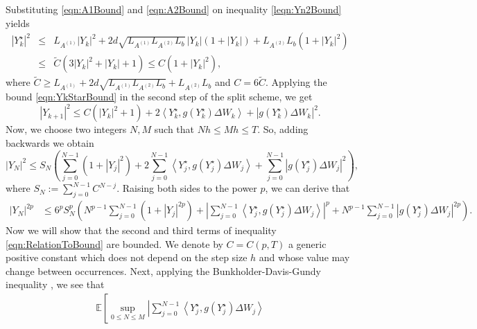 \documentclass[sort&compress, preprint]{elsarticle}
\theoremstyle{definition}
\theoremstyle{plain}%
\theoremstyle{remark}
\newcommand{\m}[1]{\mathbb{E}#1}
\newcommand{\innerprod}[2]{\left\langle#1, #2\right\rangle}
\begin{document}
\begin{pf}
	Substituting \eqref{eqn:A1Bound} and \eqref{eqn:A2Bound}  on  inequality \eqref{leqn:Yn2Bound} yields
	\begin{eqnarray}\label{eqn:YkStarBound}
		|Y_k^{\star}|^2
		&\leq&	L_{A^{(1)}} |Y_k|^2
			+ 2 d \sqrt{L_{A^{(1)}} L_{A^{(2)}} L_b }\,|Y_k|(1+|Y_k|)
			+L_{A^{(2)}} L_b (1+|Y_k|^2) \nonumber\\
			&\leq& 
				\widetilde{C}(3|Y_k|^2+|Y_k| + 1) 			
			\leq C(1+|Y_k|^2),
	\end{eqnarray}
	where $\widetilde{C}\geq L_{A^{(1)}}+ 2 d \sqrt{L_{A^{(1)}} L_{A^{(2)}} L_b} + 
	L_{A^{(2)}} L_b$ and $C=6\widetilde{C}$. Applying  the bound \eqref{eqn:YkStarBound} 
	in the  second step of the split scheme, we get
	\begin{equation*}
		|Y_{k+1}|^2
		\leq
			C \left(
				|Y_k|^2 + 1
			\right)
			+ 2\innerprod{Y^{\star}_k}{g(Y^{\star}_k) \Delta W_k}
			+ \left|g(Y^{\star}_k) \Delta W_k \right|^2.
	\end{equation*}
	Now, we choose two integers $N,M$ such that $Nh\leq Mh \leq T$. So, adding 
	backwards we obtain
	\begin{equation*}
		|Y_N|^2
			\leq
			S_N\left(
				\sum_{j=0}^{N-1}
					(1+|Y_j|^2)
				+
				2\sum_{j=0}^{N-1}
					\innerprod{Y_j^{\star}}{g(Y_j^{\star}) \Delta W_j}
				+
				\sum_{j=0}^{N-1}
					\left|
						g(Y_j^{\star}) \Delta W_j
					\right|^2
			\right),
	\end{equation*}
	where	$S_N:=	\sum_{j=0}^{N-1}C^{N-j}$. Raising both sides to the power $p$,  we can derive that 
	\begin{align}\label{eqn:RelationToBound}
		|Y_N|^{2p}	
			&\leq
				6^{p} S_N^p
				\left(
					N^{p-1}
						\sum_{j=0}^{N-1}
						(1+|Y_j|^{2p})	
					+
					\left|
						\sum_{j=0}^{N-1}
						\innerprod{Y_j^{\star}}{g(Y_j^{\star}) \Delta W_j}
					\right|^p
					+
					N^{p-1}
					\sum_{j=0}^{N-1}
						\left|
							g(Y_j^{\star}) \Delta W_j
						\right|^{2 p}				
				\right).
	\end{align}
	Now we will show that the second and third terms of inequality \eqref{eqn:RelationToBound} are bounded.
	We denote by $C=C(p,T)$ a generic positive constant which does not depend on  the step size $h$ and whose
	value may change between occurrences.	Next, applying the Bunkholder-Davis-Gundy
	inequality  \cite{Mao2007}, we see that
	\begin{align}\label{eqn:BoundSecondTerm}
		\m
		\left[
			\sup_{0\leq N \leq M}
			\left|
				\sum_{j=0}^{N-1}
					\innerprod{Y_j^{\star}}{g(Y_j^{\star})\Delta W_j}

\end{align}
\end{pf}
\end{document}
